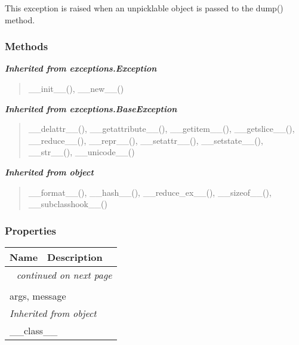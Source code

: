 This exception is raised when an unpicklable object is passed to the dump()
method.



  \subsubsection{Methods}


\large{\textbf{\textit{Inherited from exceptions.Exception}}}

\begin{quote}
\_\_init\_\_(), \_\_new\_\_()
\end{quote}

\large{\textbf{\textit{Inherited from exceptions.BaseException}}}

\begin{quote}
\_\_delattr\_\_(), \_\_getattribute\_\_(), \_\_getitem\_\_(), \_\_getslice\_\_(), \_\_reduce\_\_(), \_\_repr\_\_(), \_\_setattr\_\_(), \_\_setstate\_\_(), \_\_str\_\_(), \_\_unicode\_\_()
\end{quote}

\large{\textbf{\textit{Inherited from object}}}

\begin{quote}
\_\_format\_\_(), \_\_hash\_\_(), \_\_reduce\_ex\_\_(), \_\_sizeof\_\_(), \_\_subclasshook\_\_()
\end{quote}


  \subsubsection{Properties}

    \vspace{-1cm}
\hspace{\varindent}\begin{longtable}{|p{\varnamewidth}|p{\vardescrwidth}|l}
\cline{1-2}
\cline{1-2} \centering \textbf{Name} & \centering \textbf{Description}& \\
\cline{1-2}
\endhead\cline{1-2}\multicolumn{3}{r}{\small\textit{continued on next page}}\\\endfoot\cline{1-2}
\endlastfoot\multicolumn{2}{|l|}{\textit{Inherited from exceptions.BaseException}}\\
\multicolumn{2}{|p{\varwidth}|}{\raggedright args, message}\\
\cline{1-2}
\multicolumn{2}{|l|}{\textit{Inherited from object}}\\
\multicolumn{2}{|p{\varwidth}|}{\raggedright \_\_class\_\_}\\
\cline{1-2}
\end{longtable}

